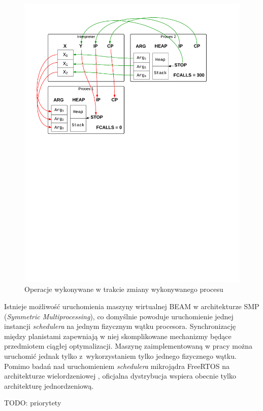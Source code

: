 \begin{figure}[h]
\centerline{\includegraphics[scale=0.8, clip, trim=10mm 145mm 30mm 10mm]{preemption}}
\caption{Operacje wykonywane w trakcie zmiany wykonywanego procesu}
\label{fig:preemption}
\end{figure}

Istnieje możliwość uruchomienia maszyny wirtualnej BEAM w architekturze SMP (\emph{Symmetric Multiprocessing}), co domyślnie powoduje uruchomienie jednej instancji \emph{schedulera} na jednym fizycznym wątku procesora.
Synchronizację między planistami zapewniają w niej skomplikowane mechanizmy będące przedmiotem ciągłej optymalizacji.
Maszynę zaimplementowaną w pracy można uruchomić jednak tylko z~wykorzystaniem tylko jednego fizycznego wątku.
Pomimo badań nad uruchomieniem \emph{schedulera} mikrojądra FreeRTOS na architekturze wielordzeniowej \cite{Mistry2011}, oficjalna dystrybucja wspiera obecnie tylko architekturę jednordzeniową.

TODO: priorytety

